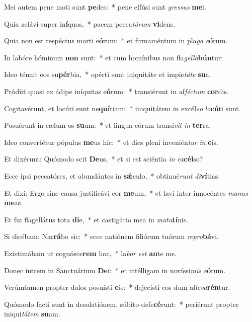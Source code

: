 \item Mei autem pene moti sunt \textbf{pe}des:~* pene effúsi sunt \textit{gressus} \textbf{me}i.
\item Quia zelávi super in\textbf{í}quos,~* pacem pecca\myhspace\textit{tórum} \textbf{vi}dens.
\item Quia non est respéctus morti e\textbf{ó}rum:~* et firmaméntum in pla\tinyhspace\textit{ga} \textit{e}\textbf{ó}rum.
\item In labóre hóminum \textbf{non} sunt:~* et cum homínibus non fla\tinyhspace\textit{gella}\textbf{bún}tur:
\item Ideo ténuit eos su\textbf{pér}bia,~* opérti sunt iniquitáte et impie\tinyhspace\textit{táte} \textbf{su}a.
\item Pródiit quasi ex ádipe iníquitas e\textbf{ó}rum:~* transiérunt in af\textit{féctum} \textbf{cor}dis.
\item Cogitavérunt, et locúti sunt ne\textbf{quí}tiam:~* iniquitátem in excél\spurhspace\textit{so} \textit{lo}\textbf{cú}ti sunt.
\item Posuérunt in cælum os \textbf{su}um:~* et lingua eórum transí\textit{vit} \textit{in} \textbf{ter}ra.
\item Ideo convertétur pópulus \textbf{me}us hic:~* et dies pleni invenién\tinyhspace\textit{tur} \textit{in} \textbf{e}is.
\item Et dixérunt: Quómodo scit \textbf{De}us,~* et si est sciéntia \textit{in} \textit{ex}\textbf{cél}so?
\item Ecce ipsi peccatóres, et abundántes in \textbf{sǽ}culo,~* obtinué\tinyhspace\textit{runt} \textit{di}\textbf{ví}tias.
\item Et dixi: Ergo sine causa justificávi cor \textbf{me}um,~* et lavi inter innocéntes \textit{manus} \textbf{me}as.
\item Et fui flagellátus tota \textbf{di}e,~* et castigátio mea in \textit{matu}\textbf{tí}nis.
\item Si dicébam: Nar\textbf{rá}bo sic:~* ecce natiónem filiórum tuórum \textit{repro}\textbf{bá}vi.
\item Existimábam ut cognósce\textbf{rem} hoc,~* la\textit{bor} \textit{est} \textbf{an}te me.
\item Donec intrem in Sanctuárium \textbf{De}i:~* et intélligam in novíssi\textit{mis} \textit{e}\textbf{ó}rum.
\item Verúmtamen propter dolos posuísti \textbf{e}is:~* dejecísti eos dum al\textit{leva}\textbf{rén}tur.
\item Quómodo facti sunt in desolatiónem, súbito defe\textbf{cé}runt:~* periérunt propter iniqui\textit{tátem} \textbf{su}am.
